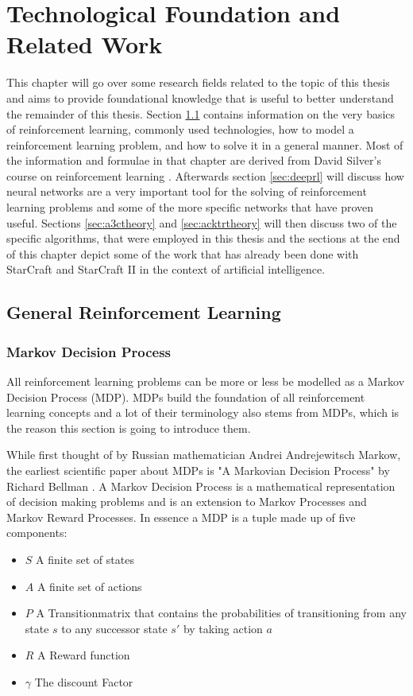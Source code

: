 
\chapter{Technological Foundation and Related Work} %

\label{chap_tech} %

This chapter will go over some research fields related to the topic of this thesis and aims to provide foundational knowledge that is useful to better understand the remainder of this thesis.
Section \ref{sec:genrl} contains information on the very basics of reinforcement learning, commonly used technologies, how to model a reinforcement learning problem, and how to solve it in a general manner. Most of the information and formulae in that chapter are derived from David Silver's course on reinforcement learning \citep{dsilver}.
Afterwards section \ref{sec:deeprl} will discuss how neural networks are a very important tool for the solving of reinforcement learning problems and some of the more specific networks that have proven useful.
Sections \ref{sec:a3ctheory} and \ref{sec:acktrtheory} will then discuss two of the specific algorithms, that were employed in this thesis and the sections at the end of this chapter depict some of the work that has already been done with StarCraft and StarCraft II in the context of artificial intelligence.
\section{General Reinforcement Learning}
\label{sec:genrl}
\subsection{Markov Decision Process}
All reinforcement learning problems can be more or less be modelled as a Markov Decision Process (MDP). MDPs build the foundation of all reinforcement learning concepts and a lot of their terminology also stems from MDPs, which is the reason this section is going to introduce them.

While first thought of by Russian mathematician Andrei Andrejewitsch Markow, the earliest scientific paper about MDPs is "A Markovian Decision Process" by Richard Bellman \cite{Bel}. A Markov Decision Process is a mathematical representation of decision making problems and is an extension to Markov Processes and Markov Reward Processes.
\newpage
In essence a MDP is a tuple made up of five components:
\begin{itemize}
\item $S$ A finite set of states
\item $A$ A finite set of actions
\item $P$ A Transitionmatrix that contains the probabilities of transitioning from any state $s$ to any successor state $s'$ by taking action $a$
\item $R$ A Reward function
\item $\gamma$ The discount Factor
\end{itemize}

